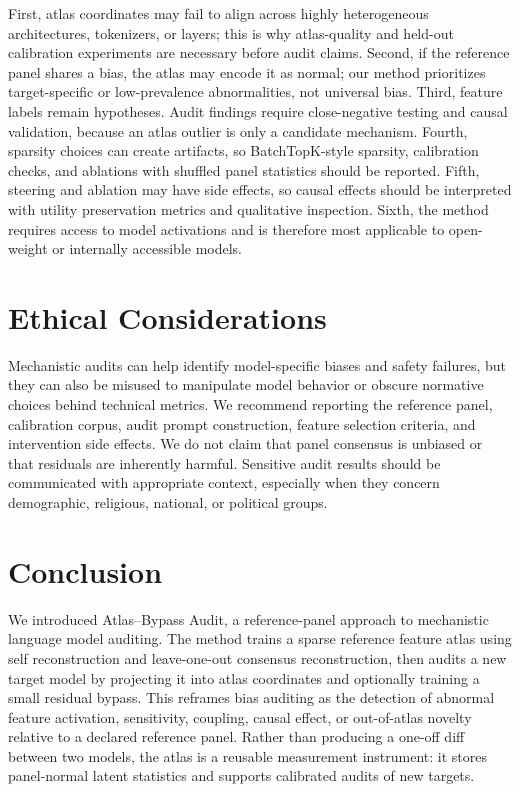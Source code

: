 \documentclass[11pt]{article}
\newcommand{\method}{Atlas--Bypass Audit\xspace}
\begin{document}
First, atlas coordinates may fail to align across highly heterogeneous architectures, tokenizers, or layers; this is why atlas-quality and held-out calibration experiments are necessary before audit claims. Second, if the reference panel shares a bias, the atlas may encode it as normal; our method prioritizes target-specific or low-prevalence abnormalities, not universal bias. Third, feature labels remain hypotheses. Audit findings require close-negative testing and causal validation, because an atlas outlier is only a candidate mechanism. Fourth, sparsity choices can create artifacts, so BatchTopK-style sparsity, calibration checks, and ablations with shuffled panel statistics should be reported. Fifth, steering and ablation may have side effects, so causal effects should be interpreted with utility preservation metrics and qualitative inspection. Sixth, the method requires access to model activations and is therefore most applicable to open-weight or internally accessible models.

\section{Ethical Considerations}

Mechanistic audits can help identify model-specific biases and safety failures, but they can also be misused to manipulate model behavior or obscure normative choices behind technical metrics. We recommend reporting the reference panel, calibration corpus, audit prompt construction, feature selection criteria, and intervention side effects. We do not claim that panel consensus is unbiased or that residuals are inherently harmful. Sensitive audit results should be communicated with appropriate context, especially when they concern demographic, religious, national, or political groups.

\section{Conclusion}

We introduced \method, a reference-panel approach to mechanistic language model auditing. The method trains a sparse reference feature atlas using self reconstruction and leave-one-out consensus reconstruction, then audits a new target model by projecting it into atlas coordinates and optionally training a small residual bypass. This reframes bias auditing as the detection of abnormal feature activation, sensitivity, coupling, causal effect, or out-of-atlas novelty relative to a declared reference panel. Rather than producing a one-off diff between two models, the atlas is a reusable measurement instrument: it stores panel-normal latent statistics and supports calibrated audits of new targets.
\end{document}
